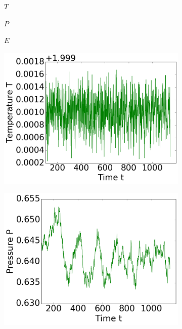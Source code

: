 \begin{figure}[ht]
\hfill
\begin{subfigure}{0.3\textwidth}
\centering
$T$
\end{subfigure}
\hfill
\begin{subfigure}{0.3\textwidth}
\centering
$P$
\end{subfigure}
\hfill
\begin{subfigure}{0.3\textwidth}
\centering
$E$
\end{subfigure}

\begin{subfigure}{0.3\textwidth}
\includegraphics[width=\textwidth]{../dat/avTemperature_T2d0_F20d0_M100.png}
\end{subfigure}
\hfill
\begin{subfigure}{0.3\textwidth}
\includegraphics[width=\textwidth]{../dat/avPressure_T2d0_F20d0_M100.png}

\end{subfigure}
\end{figure}
